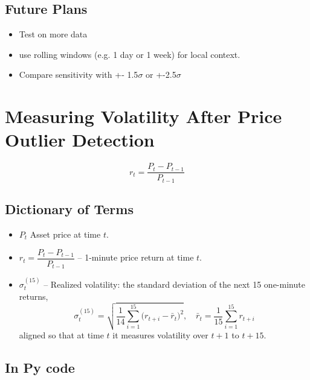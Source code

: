 \documentclass[12pt]{article}
\begin{document}
\subsection*{Future Plans}

\begin{itemize}
    \item Test on more data
    \item use rolling windows (e.g. 1 day or 1 week) for local context.
    \item Compare sensitivity with +- 1.5$\sigma$ or +-2.5$\sigma$
\end{itemize}

\newpage





\section*{Measuring Volatility After Price Outlier Detection}


\begin{equation}
    r_t = \frac{P_{t} - P_{t-1}}{P_{t-1}}
\end{equation}


\subsection*{Dictionary of Terms}

\begin{itemize}
    \item $P_t$  
      Asset price at time $t$.
    \item $r_t = \dfrac{P_t - P_{t-1}}{P_{t-1}}$  
      – 1-minute price return at time $t$.
    \item $\sigma^{\mathrm{(15)}}_{t}$  
      – Realized volatility: the standard deviation of the next 15 one-minute returns,
      \[
        \sigma^{\mathrm{(15)}}_{t}
        = \sqrt{\frac{1}{14}\sum_{i=1}^{15}\bigl(r_{t+i}-\bar r_{t}\bigr)^{2}},
        \quad
        \bar r_{t} = \frac{1}{15}\sum_{i=1}^{15} r_{t+i}
      \]
      aligned so that at time $t$ it measures volatility over $t+1$ to $t+15$.
\end{itemize}



\subsection*{In Py code}
\end{document}
